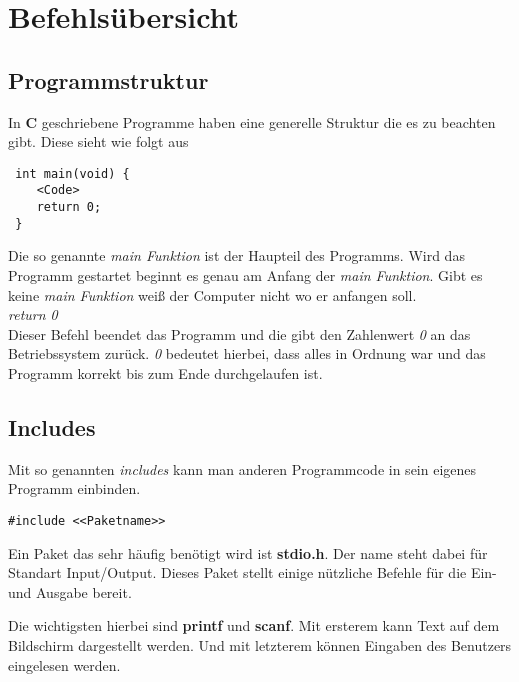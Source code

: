 \documentclass[c_worksheet.tex]{subfiles}
\begin{document}
	
\chapter{Befehlsübersicht} 

\section{Programmstruktur}

In \textbf{C} geschriebene Programme haben eine generelle Struktur die es zu beachten gibt. Diese sieht wie folgt aus

\begin{lstlisting}
 int main(void) {
    <Code>
    return 0;
 }
 \end{lstlisting} 

Die so genannte \emph{main Funktion} ist der Haupteil des Programms. Wird das Programm gestartet beginnt es genau am Anfang der \emph{main Funktion}. Gibt es keine \emph{main Funktion} weiß der Computer nicht wo er anfangen soll. \\

\textit{return 0} \\

Dieser Befehl beendet das Programm und die gibt den Zahlenwert \emph{0} an das Betriebssystem zurück. \emph{0} bedeutet hierbei, dass alles in Ordnung war und das Programm korrekt bis zum Ende durchgelaufen ist.



\section{Includes} 

Mit so genannten \emph{includes} kann man anderen Programmcode in sein eigenes Programm einbinden.

\begin{lstlisting}
#include <<Paketname>>
\end{lstlisting}

Ein Paket das sehr häufig benötigt wird ist \textbf{stdio.h}. Der name steht dabei für Standart Input/Output. Dieses Paket stellt einige nützliche Befehle für die Ein- und Ausgabe bereit.

Die wichtigsten hierbei sind \textbf{printf} und \textbf{scanf}. Mit ersterem kann Text auf dem Bildschirm dargestellt werden. Und mit letzterem können Eingaben des Benutzers eingelesen werden.

 
\end{document}
